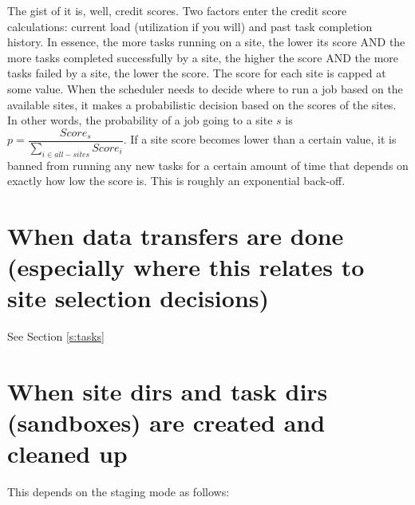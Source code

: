 \documentclass[12pt,letterpaper]{report}
\begin{document}
The gist of it is, well, credit scores. Two factors enter the credit score calculations: current load (utilization if you will) and past task completion history. In essence, the more tasks running on a site, the lower its score AND the more tasks completed successfully by a site, the higher the score AND the more tasks failed by a site, the lower the score. The score for each site is capped at some value. When the scheduler needs to decide where to run a job based on the available sites, it makes a probabilistic decision based on the scores of the sites. In other words, the probability of a job going to a site $s$ is $p = \dfrac{Score_s}{\sum_{i \in all-sites} Score_i}$. If a site score becomes lower than a certain value, it is banned from running any new tasks for a certain amount of time that depends on exactly how low the score is. This is roughly an exponential back-off.

\section{When data transfers are done (especially where this relates to site 
selection decisions)}

See Section \ref{s:tasks}

\section{When site dirs and task dirs (sandboxes) are created and cleaned up}

This depends on the staging mode as follows:
\end{document}
